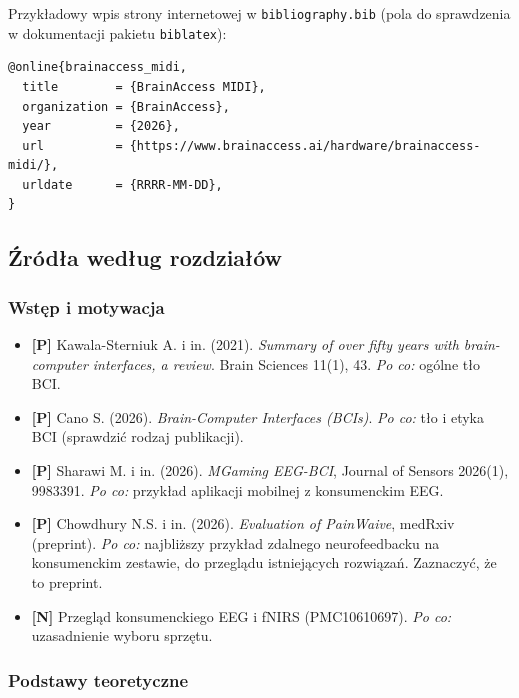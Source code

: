 Przykładowy wpis strony internetowej w \texttt{bibliography.bib}
(pola do sprawdzenia w dokumentacji pakietu \texttt{biblatex}):

\begin{verbatim}
@online{brainaccess_midi,
  title        = {BrainAccess MIDI},
  organization = {BrainAccess},
  year         = {2026},
  url          = {https://www.brainaccess.ai/hardware/brainaccess-midi/},
  urldate      = {RRRR-MM-DD},
}
\end{verbatim}

\subsection{Źródła według rozdziałów}

\subsubsection*{Wstęp i motywacja}

\begin{itemize}
    \item \textbf{[P]} Kawala-Sterniuk A. i in. (2021).
          \emph{Summary of over fifty years with brain-computer interfaces,
          a review}. Brain Sciences 11(1), 43.
          \emph{Po co:} ogólne tło BCI.
    \item \textbf{[P]} Cano S. (2026). \emph{Brain-Computer Interfaces (BCIs)}.
          \emph{Po co:} tło i etyka BCI (sprawdzić rodzaj publikacji).
    \item \textbf{[P]} Sharawi M. i in. (2026).
          \emph{MGaming EEG-BCI}, Journal of Sensors 2026(1), 9983391.
          \emph{Po co:} przykład aplikacji mobilnej z konsumenckim EEG.
    \item \textbf{[P]} Chowdhury N.S. i in. (2026).
          \emph{Evaluation of PainWaive}, medRxiv (preprint).
          \emph{Po co:} najbliższy przykład zdalnego neurofeedbacku
          na konsumenckim zestawie, do przeglądu istniejących rozwiązań.
          Zaznaczyć, że to preprint.
    \item \textbf{[N]} Przegląd konsumenckiego EEG i fNIRS
          (PMC10610697). \emph{Po co:} uzasadnienie wyboru sprzętu.
\end{itemize}

\subsubsection*{Podstawy teoretyczne}

